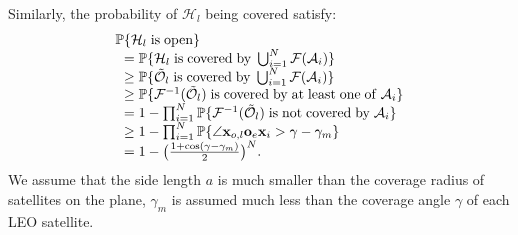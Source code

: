 \documentclass[final]{IEEEtran}
\begin{document}
Similarly, the probability of $\mathcal{H}_{l}$ being covered satisfy:
\begin{equation}
\begin{array}{r@{}l}
    \P&\displaystyle\{\mathcal{H}_{l}\;{\rm is\;open}\}\\
    &=\P\{\mathcal{H}_{l}\;{\rm is\;covered\;by\;}\bigcup_{i=1}^{N}\mathcal{F}(\mathcal{A}_i)\}\\
    &\geq\P\{\tilde{\mathcal{O}}_{l}\;{\rm is\;covered\;by\;}\bigcup_{i=1}^{N}\mathcal{F}(\mathcal{A}_i)\}\\
    &\geq\P\{\mathcal{F}^{-1}(\tilde{\mathcal{O}}_{l})\;{\rm is\;covered\;by\;at\; least\;one\;of\;}\mathcal{A}_i\}\\
    & =1-\prod_{i=1}^{N}\P\{\mathcal{F}^{-1}(\tilde{\mathcal{O}}_{l})\;{\rm is\;not\;covered\;by\;}\mathcal{A}_i\}\\
    &\geq1-\prod_{i=1}^{N}\P\{\angle \textbf{x}_{o,l} \textbf{o}_e \textbf{x}_i>\gamma-\gamma_m\}\\
    &=1-\big(\frac{1+\cos(\gamma-\gamma_m)}{2}\big)^{N}.\\
\end{array}
\end{equation}
\indent We assume that the side length $a$ is much smaller than the coverage radius of satellites on the plane, $\gamma_m$ is assumed much less than the coverage angle $\gamma$ of each LEO satellite.
\end{document}
